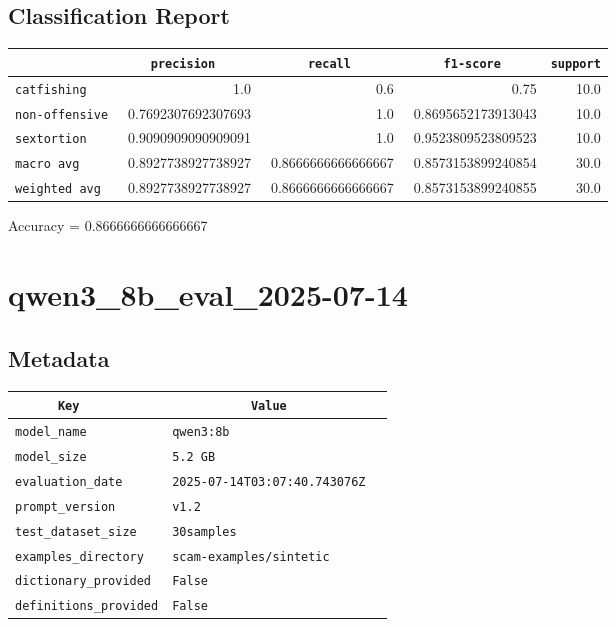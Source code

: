 \documentclass{article}
\begin{document}
\subsection{Classification Report}

\begin{center}
\begin{tabular}{l | r | r | r | r} \hline
    \verb|            | & \verb|    precision     | & \verb|      recall      | & \verb|     f1-score     | & \verb|support| \\ \hline
    \hline
    \verb|catfishing | & 1.0 & 0.6 & 0.75 &    10.0 \\ \hline
    \verb|non-offensive| & 0.7692307692307693 & 1.0 & 0.8695652173913043 &    10.0 \\ \hline
    \verb|sextortion | & 0.9090909090909091 & 1.0 & 0.9523809523809523 &    10.0 \\ \hline
    \verb|macro avg  | & 0.8927738927738927 & 0.8666666666666667 & 0.8573153899240854 &    30.0 \\ \hline
    \verb|weighted avg| & 0.8927738927738927 & 0.8666666666666667 & 0.8573153899240855 &    30.0 \\ \hline
\end{tabular}
\end{center}

\begin{center}
Accuracy = 0.8666666666666667
\end{center}

\section{qwen3\_8b\_eval\_2025-07-14}
\subsection{Metadata}

\begin{center}
\begin{tabular}{l | l} \hline
    \verb|      Key      | & \verb|           Value           | \\ \hline
    \hline
    \verb|model_name    | & \verb|qwen3:8b                     | \\ \hline
    \verb|model_size    | & \verb|5.2 GB                       | \\ \hline
    \verb|evaluation_date| & \verb|2025-07-14T03:07:40.743076Z  | \\ \hline
    \verb|prompt_version| & \verb|v1.2                         | \\ \hline
    \verb|test_dataset_size| & \verb|30samples                    | \\ \hline
    \verb|examples_directory| & \verb|scam-examples/sintetic       | \\ \hline
    \verb|dictionary_provided| & \verb|False                        | \\ \hline
    \verb|definitions_provided| & \verb|False                        | \\ \hline
\end{tabular}
\end{center}
\end{document}
